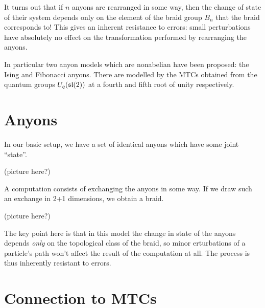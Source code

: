 It turns out that if $n$ anyons are rearranged in some way, then the change of
state of their system depends only on the element of the braid group $B_n$ that
the braid corresponds to! This gives an inherent resistance to errors: small
perturbations have absolutely no effect on the transformation performed by
rearranging the anyons.


In particular two anyon models which are nonabelian have been proposed: the
Ising and Fibonacci anyons. There are modelled by the MTCs obtained from the
quantum groups $U_q(\mathfrak{sl}(2))$ at a fourth and fifth root of unity respectively. 




\section{Anyons}
In our basic setup, we have a set of identical anyons which have some joint ``state''.


\begin{center}
    (picture here?)
\end{center}

A computation consists of exchanging the anyons in some way. If we draw such an
exchange in 2+1 dimensions, we obtain a braid. 

\begin{center}
    (picture here?)
\end{center}

The key point here is that in this model the change in state of the anyons
depends \emph{only} on the topological class of the braid, so minor
erturbations of a particle's path won't affect the result of the computation at
all. The process is thus inherently resistant to errors. 

\section{Connection to MTCs}

